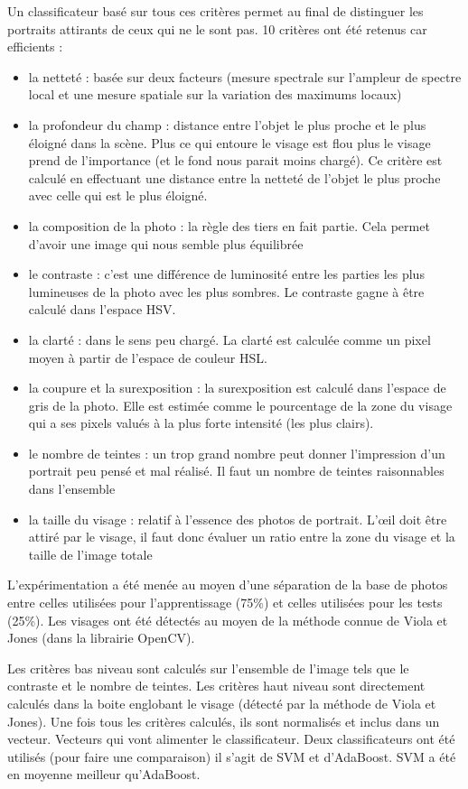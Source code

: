 \documentclass[11pt, french]{report-rd-info}
\begin{document}
Un classificateur basé sur tous ces critères permet au final de distinguer les portraits attirants de ceux qui ne le sont pas. 10 critères ont été retenus car efficients : 
\begin{itemize}
\item la netteté : basée sur deux facteurs (mesure spectrale sur l’ampleur de spectre local et une mesure spatiale sur la variation des maximums locaux)
\item la profondeur du champ : distance entre l’objet le plus proche et le plus éloigné dans la scène. Plus ce qui entoure le visage est flou plus le visage prend de l’importance (et le fond nous parait moins chargé). Ce critère est calculé en effectuant une distance entre la netteté de l’objet le plus proche avec celle qui est le plus éloigné.
\item la composition de la photo : la règle des tiers en fait partie. Cela permet d’avoir une image qui nous semble plus équilibrée
\item le contraste : c’est une différence de luminosité entre les parties les plus lumineuses de la photo avec les plus sombres. Le contraste gagne à être calculé dans l’espace HSV.
\item la clarté : dans le sens peu chargé. La clarté est calculée comme un pixel moyen à partir de l’espace de couleur HSL.
\item la coupure et la surexposition : la surexposition est calculé dans l’espace de gris de la photo. Elle est estimée comme le pourcentage de la zone du visage qui a ses pixels valués à la plus forte intensité (les plus clairs).
\item  le nombre de teintes : un trop grand nombre peut donner l’impression d’un portrait peu pensé et mal réalisé. Il faut un nombre de teintes raisonnables dans l’ensemble
\item la taille du visage : relatif à l’essence des photos de portrait. L’œil doit être attiré par le visage, il faut donc évaluer un ratio entre la zone du visage et la taille de l’image totale
\end{itemize}

L'expérimentation a été menée au moyen d’une séparation de la base de photos entre celles utilisées pour l’apprentissage (75\%) et celles utilisées pour les tests (25\%). Les visages ont été détectés au moyen de la méthode connue de Viola et Jones (dans la librairie OpenCV).

Les critères bas niveau sont calculés sur l’ensemble de l’image tels que le contraste et le nombre de teintes. Les critères haut niveau sont directement calculés dans la boite englobant le visage (détecté par la méthode de Viola et Jones). Une fois tous les critères calculés, ils sont normalisés et inclus dans un vecteur. Vecteurs qui vont alimenter le classificateur. Deux classificateurs ont été utilisés (pour faire une comparaison) il s’agit de SVM et d’AdaBoost. SVM a été en moyenne meilleur qu’AdaBoost.
\end{document}

